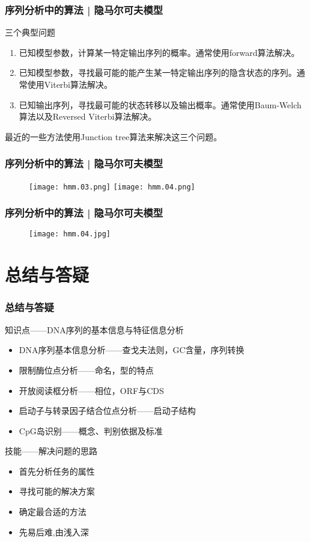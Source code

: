\begin{frame}
  \frametitle{序列分析中的算法 | 隐马尔可夫模型}
  \begin{block}{三个典型问题}
    \begin{enumerate}
      \item 已知模型参数，计算某一特定输出序列的概率。通常使用forward算法解决。
      \item 已知模型参数，寻找最可能的能产生某一特定输出序列的隐含状态的序列。通常使用Viterbi算法解决。
      \item 已知输出序列，寻找最可能的状态转移以及输出概率。通常使用Baum-Welch算法以及Reversed Viterbi算法解决。
    \end{enumerate}
  \end{block}
最近的一些方法使用Junction tree算法来解决这三个问题。
\end{frame}

\begin{frame}
  \frametitle{序列分析中的算法 | 隐马尔可夫模型}
  \begin{figure}
    \centering
    \texttt{[image: hmm.03.png]}
    \texttt{[image: hmm.04.png]}
  \end{figure}
\end{frame}

\begin{frame}
  \frametitle{序列分析中的算法 | 隐马尔可夫模型}
  \begin{figure}
    \centering
    \texttt{[image: hmm.04.jpg]}
  \end{figure}
\end{frame}

\section{总结与答疑}
\begin{frame}
  \frametitle{总结与答疑}
  \begin{block}{知识点——DNA序列的基本信息与特征信息分析}
    \begin{itemize}
      \item DNA序列基本信息分析——查戈夫法则，GC含量，序列转换
      \item 限制酶位点分析——命名，型的特点
      \item 开放阅读框分析——相位，ORF与CDS
      \item 启动子与转录因子结合位点分析——启动子结构
      \item CpG岛识别——概念、判别依据及标准
    \end{itemize}
  \end{block}
  \begin{block}{技能——解决问题的思路}
    \begin{itemize}
      \item 首先分析任务的属性
      \item 寻找可能的解决方案
      \item 确定最合适的方法
      \item 先易后难,由浅入深
    \end{itemize}
  \end{block}
\end{frame}